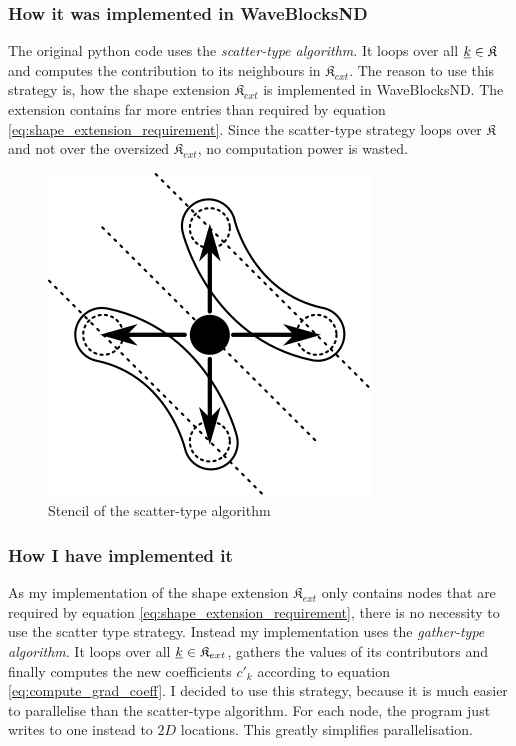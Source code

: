 \documentclass{article}
\begin{document}
\subsubsection{How it was implemented in WaveBlocksND}
The original python code uses the \emph{scatter-type algorithm}.
It loops over all \(\underline{k} \in \mathfrak{K}\) and computes the contribution
to its neighbours in \(\mathfrak{K}_{ext}\). The reason to use this strategy is,
how the shape extension \(\mathfrak{K}_{ext}\) is implemented in WaveBlocksND.
The extension contains far more entries than required by equation
\eqref{eq:shape_extension_requirement}.
Since the scatter-type strategy loops over \(\mathfrak{K}\) and
not over the oversized \(\mathfrak{K}_{ext}\), no computation power is wasted.

\begin{figure}[H]
  \centering
  \includegraphics{grad_scatter_stencil}
  \caption{Stencil of the scatter-type algorithm}
  \label{fig:grad_scatter_stencil}
\end{figure}

\subsubsection{How I have implemented it}
As my implementation of the shape extension \(\mathfrak{K}_{ext}\) only contains
nodes that are required by equation \eqref{eq:shape_extension_requirement},
there is no necessity to use the scatter type strategy.
Instead my implementation uses the \emph{gather-type algorithm}. It loops over all
\(\underline{k} \in \mathfrak{K}_{ext}\), gathers the values of its contributors
and finally computes the new coefficients \(c'_k\) according to equation
\eqref{eq:compute_grad_coeff}.
I decided to use this strategy, because it is much easier to parallelise than the
scatter-type algorithm.
For each node, the program just writes to one instead to \(2D\) locations.
This greatly simplifies parallelisation.
\end{document}
